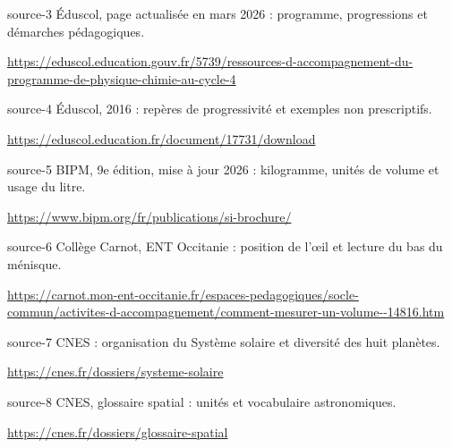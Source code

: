 \documentclass[12pt,twoside,openany]{book}
\begin{document}
\begin{blocLivre}{source-3}
Éduscol, page actualisée en mars 2026 : programme, progressions et démarches pédagogiques.\par
{\otLight\fontsize{9}{12}\selectfont\color{otMuted}\url{https://eduscol.education.gouv.fr/5739/ressources-d-accompagnement-du-programme-de-physique-chimie-au-cycle-4}}\par\end{blocLivre}
\begin{blocLivre}{source-4}
Éduscol, 2016 : repères de progressivité et exemples non prescriptifs.\par
{\otLight\fontsize{9}{12}\selectfont\color{otMuted}\url{https://eduscol.education.fr/document/17731/download}}\par\end{blocLivre}
\begin{blocLivre}{source-5}
BIPM, 9e édition, mise à jour 2026 : kilogramme, unités de volume et usage du litre.\par
{\otLight\fontsize{9}{12}\selectfont\color{otMuted}\url{https://www.bipm.org/fr/publications/si-brochure/}}\par\end{blocLivre}
\begin{blocLivre}{source-6}
Collège Carnot, ENT Occitanie : position de l’œil et lecture du bas du ménisque.\par
{\otLight\fontsize{9}{12}\selectfont\color{otMuted}\url{https://carnot.mon-ent-occitanie.fr/espaces-pedagogiques/socle-commun/activites-d-accompagnement/comment-mesurer-un-volume--14816.htm}}\par\end{blocLivre}
\begin{blocLivre}{source-7}
CNES : organisation du Système solaire et diversité des huit planètes.\par
{\otLight\fontsize{9}{12}\selectfont\color{otMuted}\url{https://cnes.fr/dossiers/systeme-solaire}}\par\end{blocLivre}
\begin{blocLivre}{source-8}
CNES, glossaire spatial : unités et vocabulaire astronomiques.\par
{\otLight\fontsize{9}{12}\selectfont\color{otMuted}\url{https://cnes.fr/dossiers/glossaire-spatial}}\par\end{blocLivre}
\end{document}
